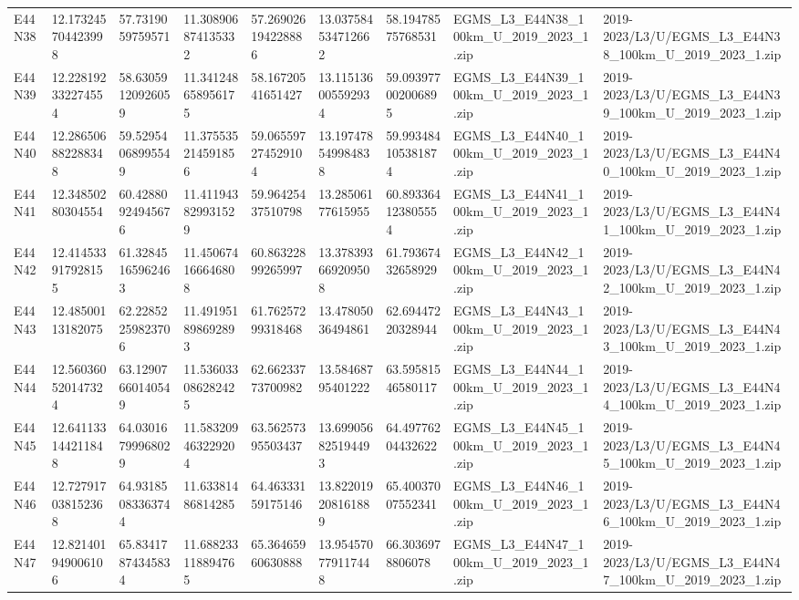 \begin{landscape}
\begin{longtable}{lllllllll}
E44N38 & 12.173245704423998 & 57.7319059759571 & 11.308906874135332 & 57.269026194228886 & 13.037584534712662 & 58.19478575768531 & EGMS\_L3\_E44N38\_100km\_U\_2019\_2023\_1.zip & 2019-2023/L3/U/EGMS\_L3\_E44N38\_100km\_U\_2019\_2023\_1.zip \\
E44N39 & 12.228192332274554 & 58.63059120926059 & 11.341248658956175 & 58.16720541651427 & 13.115136005592934 & 59.093977002006895 & EGMS\_L3\_E44N39\_100km\_U\_2019\_2023\_1.zip & 2019-2023/L3/U/EGMS\_L3\_E44N39\_100km\_U\_2019\_2023\_1.zip \\
E44N40 & 12.286506882288348 & 59.52954068995549 & 11.375535214591856 & 59.065597274529104 & 13.197478549984838 & 59.993484105381874 & EGMS\_L3\_E44N40\_100km\_U\_2019\_2023\_1.zip & 2019-2023/L3/U/EGMS\_L3\_E44N40\_100km\_U\_2019\_2023\_1.zip \\
E44N41 & 12.34850280304554 & 60.42880924945676 & 11.411943829931529 & 59.96425437510798 & 13.28506177615955 & 60.893364123805554 & EGMS\_L3\_E44N41\_100km\_U\_2019\_2023\_1.zip & 2019-2023/L3/U/EGMS\_L3\_E44N41\_100km\_U\_2019\_2023\_1.zip \\
E44N42 & 12.414533917928155 & 61.32845165962463 & 11.450674166646808 & 60.86322899265997 & 13.378393669209508 & 61.79367432658929 & EGMS\_L3\_E44N42\_100km\_U\_2019\_2023\_1.zip & 2019-2023/L3/U/EGMS\_L3\_E44N42\_100km\_U\_2019\_2023\_1.zip \\
E44N43 & 12.48500113182075 & 62.22852259823706 & 11.491951898692893 & 61.76257299318468 & 13.47805036494861 & 62.69447220328944 & EGMS\_L3\_E44N43\_100km\_U\_2019\_2023\_1.zip & 2019-2023/L3/U/EGMS\_L3\_E44N43\_100km\_U\_2019\_2023\_1.zip \\
E44N44 & 12.560360520147324 & 63.12907660140549 & 11.536033086282425 & 62.66233773700982 & 13.58468795401222 & 63.59581546580117 & EGMS\_L3\_E44N44\_100km\_U\_2019\_2023\_1.zip & 2019-2023/L3/U/EGMS\_L3\_E44N44\_100km\_U\_2019\_2023\_1.zip \\
E44N45 & 12.641133144211848 & 64.03016799968029 & 11.583209463229204 & 63.56257395503437 & 13.699056825194493 & 64.49776204432622 & EGMS\_L3\_E44N45\_100km\_U\_2019\_2023\_1.zip & 2019-2023/L3/U/EGMS\_L3\_E44N45\_100km\_U\_2019\_2023\_1.zip \\
E44N46 & 12.727917038152368 & 64.93185083363744 & 11.63381486814285 & 64.46333159175146 & 13.822019208161889 & 65.40037007552341 & EGMS\_L3\_E44N46\_100km\_U\_2019\_2023\_1.zip & 2019-2023/L3/U/EGMS\_L3\_E44N46\_100km\_U\_2019\_2023\_1.zip \\
E44N47 & 12.821401949006106 & 65.83417874345834 & 11.688233118894765 & 65.36465960630888 & 13.954570779117448 & 66.3036978806078 & EGMS\_L3\_E44N47\_100km\_U\_2019\_2023\_1.zip & 2019-2023/L3/U/EGMS\_L3\_E44N47\_100km\_U\_2019\_2023\_1.zip \\

\end{longtable}
\end{landscape}
